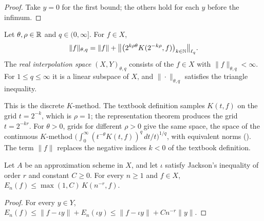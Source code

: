 \begin{proof}
\leanok
Take $y = 0$ for the first bound; the others hold for each $y$ before the infimum.
\end{proof}

\begin{definition}
\label{def:interpolation}
\leanok
{}
Let $\theta, \rho \in \mathbb{R}$ and $q \in (0, \infty]$. For $f \in X$,
\[
  \|f\|_{\theta, q} = \|f\| + \bigl\| \bigl(2^{k\rho\theta} K(2^{-k\rho}, f)\bigr)_{k \in \mathbb{N}}
  \bigr\|_{\ell_q} .
\]
The \emph{real interpolation space} $(X, Y)_{\theta, q}$ consists of the $f \in X$ with
$\|f\|_{\theta, q} < \infty$. For $1 \leq q \leq \infty$ it is a linear subspace of $X$, and
$\|\cdot\|_{\theta, q}$ satisfies the triangle inequality.
\end{definition}

This is the discrete $K$-method. The textbook definition samples $K(t, f)$ on the grid
$t = 2^{-k}$, which is $\rho = 1$; the representation theorem produces the grid $t = 2^{-kr}$.
For $\theta > 0$, grids for different $\rho > 0$ give the same space, the space of the
continuous $K$-method
$\bigl(\int_0^\infty (t^{-\theta} K(t, f))^q \, dt/t\bigr)^{1/q}$, with equivalent norms
(). The term $\|f\|$ replaces the negative indices
$k < 0$ of the textbook definition.

\begin{lemma}
\label{lem:error-k-functional}
\leanok
{}
Let $A$ be an approximation scheme in $X$, and let $\iota$ satisfy Jackson's inequality of
order $r$ and constant $C \geq 0$. For every $n \geq 1$ and $f \in X$,
$E_n(f) \leq \max(1, C) \, K(n^{-r}, f)$.
\end{lemma}

\begin{proof}
\leanok
{}
For every $y \in Y$, $E_n(f) \leq \|f - \iota y\| + E_n(\iota y) \leq \|f - \iota y\| + C
n^{-r} \|y\|$.
\end{proof}

